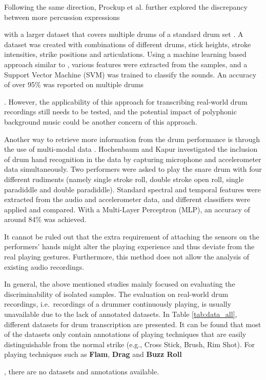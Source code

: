 \documentclass{article}
\begin{document}
Following the same direction, Prockup et al. further explored the discrepancy between more percussion expressions {\color{red}{now is it gestures or technique or expression?} with a larger dataset that covers multiple drums of a standard drum set \cite{Prockup2013}. A dataset was created with combinations of different drums, stick heights, stroke intensities, strike positions and articulations. Using a machine learning based approach similar to \cite{Tindale2004}, various features were extracted from the samples, and a Support Vector Machine (SVM) was trained to classify the sounds. An accuracy of over 95\% was reported on multiple drums{\color{red}{more specifics? How many classes, what features}. However, the applicability of this approach for transcribing real-world drum recordings still needs to be tested, and the potential impact of polyphonic background music could be another concern of this approach.
 
Another way to retrieve more information from the drum performance is through the use of multi-modal data \cite{Hochenbaum2011}. Hochenbaum and Kapur investigated the inclusion of drum hand recognition in the data by capturing microphone and accelerometer data simultaneously. Two performers were asked to play the snare drum with four different rudiments (namely single stroke roll, double stroke open roll, single paradiddle and double paradiddle). Standard spectral and temporal features were extracted from the audio and accelerometer data, and different classifiers were applied and compared. With a Multi-Layer Perceptron (MLP), an accuracy of around 84\% was achieved. {\color{red}{again,more info on features and classes?} It cannot be ruled out that the extra requirement of attaching the sensors on the performers' hands might alter the playing experience and thus deviate from the real playing gestures. Furthermore, this method does not allow the analysis of existing audio recordings. 

In general, the above mentioned studies mainly focused on evaluating the discriminability of isolated samples. The evaluation on real-world drum recordings, i.e.\ recordings of a drummer continuously playing, is usually unavailable due to the lack of annotated datasets. In Table \ref{tab:data_all}, different datasets for drum transcription are presented. It can be found that most of the datasets only contain annotations of playing techniques that are easily distinguishable from the normal strike (e.g., Cross Stick, Brush, Rim Shot). For playing techniques such as \textbf{Flam}, \textbf{Drag} and \textbf{Buzz Roll} {\color{red}{why bold?}, there are no datasets and annotations available. 

}}}}
\end{document}

